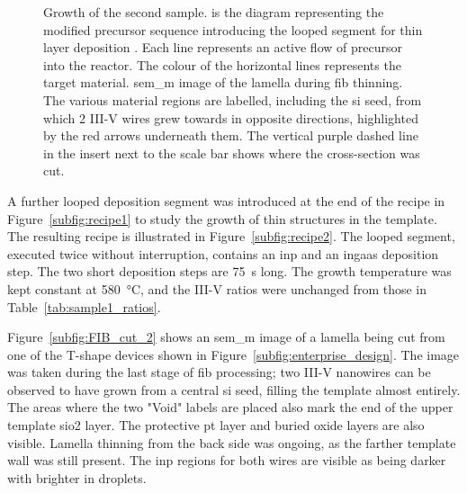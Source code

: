 \begin{figure}
{
    }
    \caption[Precursor sequence and \acs{sem_m}-\acs{fib} image of a cross-section of a wire from sample 2]{Growth of the second sample.  is the diagram representing the modified precursor sequence introducing the looped segment for thin layer deposition \cite{Brugnolotto2023}. Each line represents an active flow of precursor into the reactor. The colour of the horizontal lines represents the target material.  \acs{sem_m} image of the lamella during \acs{fib} thinning. The various material regions are labelled, including the \acs{si} seed, from which \num{2} III-V wires grew towards in opposite directions, highlighted by the red arrows underneath them. The vertical purple dashed line in the insert next to the scale bar shows where the cross-section was cut.}
    \label{fig:sample2_growth}
\end{figure}

A further looped deposition segment was introduced at the end of the recipe in Figure~\ref{subfig:recipe1} to study the growth of thin structures in the template. The resulting recipe is illustrated in Figure~\ref{subfig:recipe2}. The looped segment, executed twice without interruption, contains an \acs{inp} and an \acs{ingaas} deposition step. The two short deposition steps are \qty{75}{s} long. The growth temperature was kept constant at \qty{580}{\degreeCelsius}, and the III-V ratios were unchanged from those in Table~\ref{tab:sample1_ratios}.

Figure~\ref{subfig:FIB_cut_2} shows an \acs{sem_m} image of a lamella being cut from one of the T-shape devices shown in Figure~\ref{subfig:enterprise_design}. The image was taken during the last stage of \acs{fib} processing; two III-V nanowires can be observed to have grown from a central \acl{si} seed, filling the template almost entirely. The areas where the two "Void" labels are placed also mark the end of the upper template \acs{sio2} layer. The protective \acl{pt} layer and buried oxide layers are also visible. Lamella thinning from the back side was ongoing, as the farther template wall was still present. The \acs{inp} regions for both wires are visible as being darker with brighter \acl{in} droplets.


